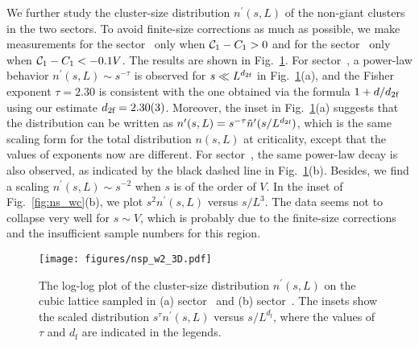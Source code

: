 We further study the cluster-size distribution $n^\prime(s, L)$ of the non-giant clusters in the two sectors. To avoid finite-size corrections
as much as possible, we make measurements for the sector~ only when ${\mathcal C}_1 - C_1 > 0$ and for the sector~ only when ${\mathcal C}_1 - C_1 < -0.1V$.
The results are shown in Fig.~\ref{fig:nsp_w2_3D}. For sector~, a power-law behavior $n^\prime(s, L) \sim s^{-\tau}$ is observed
for $s \ll L^{{d_{2\textrm{f}}}}$ in Fig.~\ref{fig:nsp_w2_3D}(a), and the Fisher exponent $\tau = 2.30$ is consistent with the one obtained via the formula $1+d/{d_{2\textrm{f}}}$ using our estimate ${d_{2\textrm{f}}}=2.30(3)$.
Moreover, the inset in Fig.~\ref{fig:nsp_w2_3D}(a) suggests that the distribution can be written as $n^\prime(s, L) = s^{-\tau}\tilde{n}^\prime(s/L^{{d_{2\textrm{f}}}})$,
which is the same scaling form for the total distribution $n(s, L)$ at criticality, except that the values of exponents now are different.
For sector~, the same power-law decay is also observed, as indicated by the black dashed line in Fig.~\ref{fig:nsp_w2_3D}(b). Besides, we find a scaling
$n^\prime(s, L) \sim s^{-2}$ when $s$ is of the order of $V$. In the inset of Fig.~\ref{fig:ns_wc}(b), we plot $s^2 n^\prime(s, L)$ versus $s/L^3$. The data
seems not to collapse very well for $s \sim V$, which is probably due to the finite-size corrections and the insufficient sample numbers for this region.
\begin{figure}[H]
	\centering
	\texttt{[image: figures/nsp\_w2\_3D.pdf]}
	\caption{The log-log plot of the cluster-size distribution $n^\prime(s, L)$ on the cubic lattice sampled in (a) sector~ and (b) sector~. 
	The insets show the scaled distribution $s^\tau n^\prime(s, L)$ versus $s/L^{d_\text{f}}$, 
	where the values of $\tau$ and $d_\text{f}$ are indicated in the legends.}
	\label{fig:nsp_w2_3D}
\end{figure}




